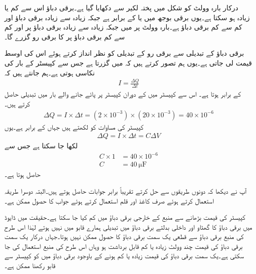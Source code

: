 درکار بارہ وولٹ کو شکل  میں پختہ لکیر سے دکھایا گیا ہے۔برقی دباؤ اس سے  کم یا زیادہ ہو سکتا ہے۔یوں برقی بوجھ میں   یا  کے برابر ہے جبکہ زیادہ سے زیادہ برقی دباؤ  اور کم سے کم برقی دباؤ  ہے۔بارہ وولٹ پر  میں  جبکہ زیادہ سے زیادہ برقی دباؤ پر   اور کم سے کم برقی دباؤ پر   کا برقی رو گزرے گا۔

برقی دباؤ کے تبدیلی سے برقی رو کے تبدیلی کو نظر انداز کرتے ہوئے اس کی اوسط قیمت لی جاتی ہے۔یوں ہم تصور کرتے ہیں کہ  میں  گزرتا ہے جس سے کپیسٹر کے بار کی نکاسی ہوتی ہے۔ہم جانتے ہیں کہ
\begin{align*}
I=\frac{\Delta Q}{\Delta t}
\end{align*}
کے برابر ہوتا ہے۔ اس سے کپیسٹر میں   کے دوران کپیسٹر پر پائے جانے والے بار میں تبدیلی  حاصل کرتے ہیں۔
\begin{align*}
\Delta Q=I \times \Delta t=\left(2 \times 10^{-3} \right) \times \left(20 \times 10^{-3} \right)=40 \times 10^{-6}
\end{align*}
کپیسٹر کی مساوات  کو  لکھتے ہیں جہاں  کے برابر ہے۔یوں
\begin{align*}
\Delta Q=I \times \Delta t=C \Delta V
\end{align*}
لکھا جا سکتا ہے جس سے
\begin{align*}
C \times 1&=40 \times 10^{-6}\\
C&=\SI{40}{\micro \farad}
\end{align*}
حاصل ہوتا ہے۔

آپ نے دیکھا کہ دونوں طریقوں سے حل کرتے تقریباً برابر جوابات حاصل ہوتے ہیں۔البتہ دوسرا طریقہ استعمال کرتے ہوئے صرف کاغذ اور قلم استعمال کرتے ہوئے جواب کا حصول ممکن ہے۔

کپیسٹر کی قیمت بڑھانے سے منبع کے خارجی برقی دباؤ میں  کم کیا جا سکتا ہے۔حقیقت میں ڈایوڈ میں برقی دباؤ کا گھٹاو اور داخلی بدلتے برقی دباؤ میں تبدیلی ہمارے قابو میں نہیں ہوتے لہٰذا اس طرح کی منبع برقی دباؤ سے قطعی یک سمت برقی دباؤ کا حصول ممکن نہیں ہوتا۔جہاں درکار یک سمت برقی دباؤ کی  قیمت چند وولٹ زیادہ یا کم  قابل برداشت ہو وہاں اس طرح کی منبع استعمال کی جا سکتی ہے۔یک سمت برقی دباؤ کی قیمت زیادہ یا کم ہونے کے باوجود برقی دباؤ میں  کو کپیسٹر سے قابو رکھنا ممکن ہے۔


